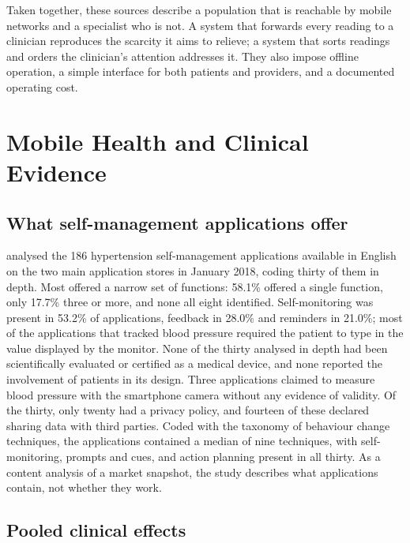 Taken together, these sources describe a population that is reachable by mobile networks and a specialist who is not. A system that forwards every reading to a clinician reproduces the scarcity it aims to relieve; a system that sorts readings and orders the clinician's attention addresses it. They also impose offline operation, a simple interface for both patients and providers, and a documented operating cost.

\section{Mobile Health and Clinical Evidence}\label{sec:outpatient}\label{sec:evidence}

\subsection{What self-management applications offer}\label{sec:apps}

\Textcite{alessa2019} analysed the 186 hypertension self-management applications available in English on the two main application stores in January 2018, coding thirty of them in depth. Most offered a narrow set of functions: 58.1\% offered a single function, only 17.7\% three or more, and none all eight identified. Self-monitoring was present in 53.2\% of applications, feedback in 28.0\% and reminders in 21.0\%; most of the applications that tracked blood pressure required the patient to type in the value displayed by the monitor. None of the thirty analysed in depth had been scientifically evaluated or certified as a medical device, and none reported the involvement of patients in its design. Three applications claimed to measure blood pressure with the smartphone camera without any evidence of validity. Of the thirty, only twenty had a privacy policy, and fourteen of these declared sharing data with third parties. Coded with the taxonomy of behaviour change techniques, the applications contained a median of nine techniques, with self-monitoring, prompts and cues, and action planning present in all thirty. As a content analysis of a market snapshot, the study describes what applications contain, not whether they work.

\subsection{Pooled clinical effects}\label{sec:efficacy}

